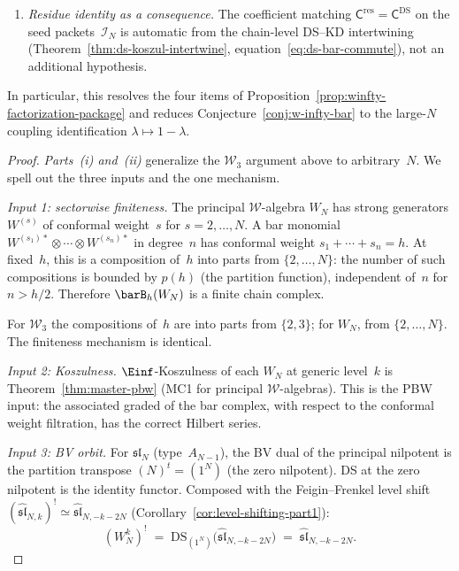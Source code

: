 \begin{theorem}
\begin{enumerate}[label=\textup{(\roman*)}]
\item \emph{Residue identity as a consequence.}
  The coefficient matching
  $\mathsf{C}^{\mathrm{res}} = \mathsf{C}^{\mathrm{DS}}$
  on the seed packets~$\mathcal{I}_N$ is automatic from the
  chain-level DS--KD intertwining
  \textup{(}Theorem~\textup{\ref{thm:ds-koszul-intertwine}},
  equation~\textup{\eqref{eq:ds-bar-commute})},
  not an additional hypothesis.
\end{enumerate}
In particular, this resolves the four items of
Proposition~\textup{\ref{prop:winfty-factorization-package}}
and reduces Conjecture~\textup{\ref{conj:w-infty-bar}} to the
large-$N$ coupling identification
$\lambda \mapsto 1 - \lambda$.
\end{theorem}

\begin{proof}
\emph{Parts~(i) and~(ii)} generalize the $\mathcal{W}_3$ argument
above to arbitrary~$N$.  We spell out the three inputs and the one
mechanism.

\emph{Input 1: sectorwise finiteness.}
The principal $\mathcal{W}$-algebra $W_N$ has strong generators
$W^{(s)}$ of conformal weight~$s$ for $s = 2, \ldots, N$.  A bar
monomial $W^{(s_1)*} \otimes \cdots \otimes W^{(s_n)*}$ in
degree~$n$ has conformal weight $s_1 + \cdots + s_n = h$.  At
fixed~$h$, this is a composition of~$h$ into parts from
$\{2, \ldots, N\}$: the number of such compositions is bounded
by $p(h)$ (the partition function), independent of~$n$ for
$n > h/2$.  Therefore $\barB_h(W_N)$ is a finite chain complex.

For $\mathcal{W}_3$ the compositions of~$h$ are into parts from
$\{2,3\}$; for $W_N$, from $\{2, \ldots, N\}$.  The finiteness
mechanism is identical.

\emph{Input 2: Koszulness.}
$\Einf$-Koszulness of each $W_N$ at generic level~$k$ is
Theorem~\ref{thm:master-pbw} (MC1 for principal
$\mathcal{W}$-algebras).  This is the PBW input: the associated
graded of the bar complex, with respect to the conformal weight
filtration, has the correct Hilbert series.

\emph{Input 3: BV orbit.}
For $\mathfrak{sl}_N$ (type~$A_{N-1}$), the BV dual of
the principal nilpotent is the partition transpose
$(N)^t = (1^N)$ (the zero nilpotent).  DS at the zero nilpotent
is the identity functor.  Composed with the Feigin--Frenkel
level shift
$(\widehat{\mathfrak{sl}}_{N,k})^!
\simeq \widehat{\mathfrak{sl}}_{N,-k-2N}$
(Corollary~\ref{cor:level-shifting-part1}):
\[
(W_N^k)^!
\;=\;
\mathrm{DS}_{(1^N)}\bigl(
\widehat{\mathfrak{sl}}_{N,-k-2N}
\bigr)
\;=\;
\widehat{\mathfrak{sl}}_{N,-k-2N}.
\]


\end{proof}
